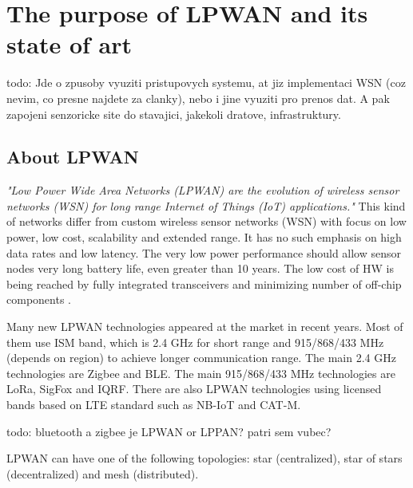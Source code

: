 \chapter{The purpose of LPWAN and its state of art}




todo: Jde o zpusoby vyuziti pristupovych systemu, at jiz implementaci WSN (coz nevim, co presne najdete za clanky), nebo i jine vyuziti pro prenos dat. A pak zapojeni senzoricke site do stavajici, jakekoli dratove, infrastruktury.


\section{About LPWAN}
\textit{"Low Power Wide Area Networks (LPWAN) are the
evolution of wireless sensor networks (WSN) for long
range Internet of Things (IoT) applications."} \cite{MURS Band for LPWAN Applications}
This kind of networks differ from custom wireless sensor networks (WSN) with focus on low power, low cost, scalability and extended range.
It has no such emphasis on high data rates and low latency.
The very low power performance should allow sensor nodes very long battery life, even greater than 10 years.
The low cost of HW is being reached by fully integrated transceivers and minimizing number of off-chip components \cite{MURS Band for LPWAN Applications}.


Many new LPWAN technologies appeared at the market in recent years.
Most of them use ISM band, which is 2.4 GHz for short range and 915/868/433 MHz (depends on region) to achieve longer communication range.
The main 2.4 GHz technologies are Zigbee and BLE.
The main 915/868/433 MHz technologies are LoRa, SigFox and IQRF.
There are also LPWAN technologies using licensed bands based on LTE standard
such as NB-IoT and CAT-M.

todo: bluetooth a zigbee je LPWAN or LPPAN? patri sem vubec?







LPWAN can have one of the following topologies: star (centralized), star of stars (decentralized) and mesh (distributed).
\cite{high density LPWAN}










